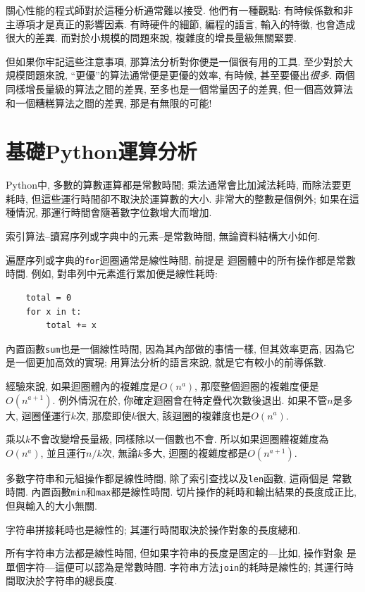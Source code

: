 \documentclass[10pt]{book}
\begin{document}
關心性能的程式師對於這種分析通常難以接受.
他們有一種觀點: 有時候係數和非主導項才是真正的影響因素. 
有時硬件的細節, 編程的語言, 輸入的特徵, 也會造成很大的差異. 
而對於小規模的問題來說, 複雜度的增長量級無關緊要. 

但如果你牢記這些注意事項, 那算法分析對你便是一個很有用的工具. 
至少對於大規模問題來說, ``更優''的算法通常便是更優的效率, 有時候, 
甚至要優出{\em 很多}. 
兩個同樣增長量級的算法之間的差異, 至多也是一個常量因子的差異, 
但一個高效算法和一個糟糕算法之間的差異, 那是有無限的可能!


\section{基礎Python運算分析}

Python中, 多數的算數運算都是常數時間;
乘法通常會比加減法耗時, 而除法要更耗時, 
但這些運行時間卻不取決於運算數的大小. 
非常大的整數是個例外; 如果在這種情況, 那運行時間會隨著數字位數增大而增加. 

索引算法--讀寫序列或字典中的元素--是常數時間, 無論資料結構大小如何. 

遍歷序列或字典的{\tt for}迴圈通常是線性時間, 前提是
迴圈體中的所有操作都是常數時間. 
例如, 對串列中元素進行累加便是線性耗時:

\begin{verbatim}
    total = 0
    for x in t:
        total += x
\end{verbatim}

內置函數{\tt sum}也是一個線性時間, 因為其內部做的事情一樣, 
但其效率更高, 因為它是一個更加高效的實現; 用算法分析的語言來說, 
就是它有較小的前導係數.

經驗來說, 如果迴圈體內的複雜度是$O(n^a)$, 那麼整個迴圈的複雜度便是
$O(n^{a+1})$. 
例外情況在於, 你確定迴圈會在特定疊代次數後退出. 
如果不管$n$是多大, 迴圈僅運行$k$次, 
那麼即使$k$很大, 該迴圈的複雜度也是$O(n^a)$.

乘以$k$不會改變增長量級, 同樣除以一個數也不會. 
所以如果迴圈體複雜度為 $O(n^a)$, 並且運行$n/k$次, 無論$k$多大, 
迴圈的複雜度都是$O(n^{a+1})$. 

多數字符串和元組操作都是線性時間, 除了索引查找以及{\tt len}函數, 這兩個是
常數時間. 內置函數{\tt min}和{\tt max}都是線性時間. 
切片操作的耗時和輸出結果的長度成正比, 但與輸入的大小無關. 

字符串拼接耗時也是線性的; 其運行時間取決於操作對象的長度總和. 

所有字符串方法都是線性時間, 但如果字符串的長度是固定的---比如, 操作對象
是單個字符---這便可以認為是常數時間.
字符串方法{\tt join}的耗時是線性的; 其運行時間取決於字符串的總長度. 
\end{document}
